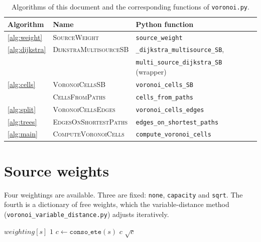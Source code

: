 \documentclass[11pt,a4paper]{article}
\theoremstyle{remark}
\begin{document}
\begin{table}[H]
\centering
\begin{tabular}{@{}lll@{}}
\toprule
Algorithm & Name & Python function \\
\midrule
\ref{alg:weight}   & \textsc{SourceWeight}          & \texttt{source\_weight} \\
\ref{alg:dijkstra} & \textsc{DijkstraMultisourceSB} & \texttt{\_dijkstra\_multisource\_SB}, \\
                   &                                & \texttt{multi\_source\_dijkstra\_SB} (wrapper) \\
\ref{alg:cells}    & \textsc{VoronoiCellsSB}        & \texttt{voronoi\_cells\_SB} \\
                   & \textsc{CellsFromPaths}        & \texttt{cells\_from\_paths} \\
\ref{alg:split}    & \textsc{VoronoiCellsEdges}     & \texttt{voronoi\_cells\_edges} \\
\ref{alg:trees}    & \textsc{EdgesOnShortestPaths}  & \texttt{edges\_on\_shortest\_paths} \\
\ref{alg:main}     & \textsc{ComputeVoronoiCells}   & \texttt{compute\_voronoi\_cells} \\
\bottomrule
\end{tabular}
\caption{Algorithms of this document and the corresponding functions of \texttt{voronoi.py}.}
\label{tab:map}
\end{table}

\section{Source weights}

Four weightings are available. Three are fixed: \texttt{none}, \texttt{capacity}
and \texttt{sqrt}. The fourth is a dictionary of free weights, which the
variable-distance method (\texttt{voronoi\_variable\_distance.py}) adjusts
iteratively.

\begin{algorithm}[H]
\caption{Weight of a source}\label{alg:weight}
\begin{algorithmic}[1]
    \State \Return $\mathit{weighting}[s]$ 
  \EndIf
   \State \Return $1$ \EndIf
  \State $c \gets \texttt{conso\_ete}(s)$ 
   \State \Return $c$ \EndIf
   \State \Return $\sqrt{c}$ \EndIf
\EndFunction
\end{algorithmic}
\end{algorithm}
\end{document}
